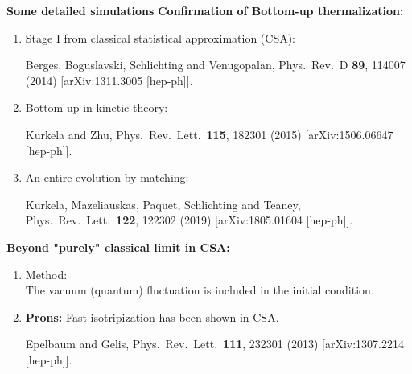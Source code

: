 \documentclass[9pt,a4paper,unknownkeysallowed,xcolor=dvipsnames,aspectratio=43]{beamer}
\begin{document}
\begin{frame}{\bf\huge Some detailed simulations}	\vspace{2mm}
{\large \bf Confirmation of Bottom-up thermalization:}\\
\vspace{2mm}
\begin{enumerate}
    \item {\large Stage I from classical statistical approximation (CSA):}
\begin{center}
    {\tiny  {\color{teablue}
  Berges, Boguslavski, Schlichting and Venugopalan,
  Phys.\ Rev.\ D {\bf 89}, 114007 (2014)
  [arXiv:1311.3005 [hep-ph]].
}}
\end{center}
    \item {\large Bottom-up in kinetic theory:}
\begin{center}
    {\tiny  {\color{teablue}
  Kurkela and Zhu,
  Phys.\ Rev.\ Lett.\  {\bf 115}, 182301 (2015)
  [arXiv:1506.06647 [hep-ph]].
}}
\end{center}
    \item {\large An entire evolution by matching:}
\begin{center}
    {\tiny  {\color{teablue}
  Kurkela, Mazeliauskas, Paquet, Schlichting and Teaney,
  Phys.\ Rev.\ Lett.\  {\bf 122}, 122302 (2019)
  [arXiv:1805.01604 [hep-ph]].
}}
\end{center} 
\end{enumerate}
\vspace{2mm}
{\large \bf Beyond "purely" classical limit in CSA:}\\
\begin{enumerate}
\vspace{1mm}
    \item {\large Method:}\\
    \vspace{1mm}
    The vacuum (quantum) fluctuation is included in the initial condition.
    \item{\large {\bf Prons:} Fast isotripization has been shown in CSA.}
    \begin{center}
    {\tiny  {\color{teablue}
  Epelbaum and Gelis,
  Phys.\ Rev.\ Lett.\  {\bf 111}, 232301 (2013)
  [arXiv:1307.2214 [hep-ph]].
}}
\end{center}
\end{enumerate}
\end{frame}
\end{document}

